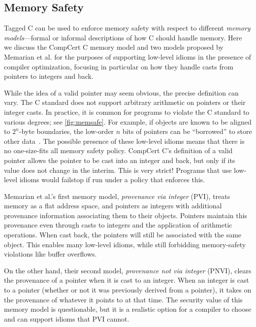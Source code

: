 \documentclass{llncs}
\begin{document}
\subsection{Memory Safety}
\label{sec:memsafe}

Tagged C can be used to enforce memory safety with respect to different {\em memory models}---formal
or informal descriptions of how C should handle memory. Here we discuss the CompCert C
memory model and two models proposed by Memarian et al. \cite{Memarian19:ExploringCSemantics}
for the purposes of supporting low-level idioms in the presence of compiler optimization, focusing in particular on how they handle
casts from pointers to integers and back.

While the idea of a valid pointer may seem obvious, the precise definition can vary. The C standard
does not support arbitrary arithmetic on pointers or their integer casts.  In practice, it is common for programs to violate the
C standard to various degrees; see \cref{fig:memsafe}. For example, if objects are known to be aligned to \(2^n\)-byte boundaries,
the low-order \(n\) bits of pointers can be ``borrowed'' to store other data~\cite{Memarian16:DeFacto}.
The possible presence of these low-level idioms means that there is no one-size-fits all memory safety policy.
CompCert C's definition of a valid pointer allows the pointer to be cast into an integer and back, but only if its value
does not change in the interim. This is very strict! Programs that use low-level idioms
would failstop if run under a policy that enforces this.

Memarian et al.'s first memory model, {\em provenance via integer} (PVI), treats memory
as a flat address space, and pointers as integers with additional provenance information
associating them to their objects. Pointers maintain this provenance even through casts to
integers and the application of arithmetic operations. When cast back, the pointers will still
be associated with the same object. This enables many low-level idioms, while still forbidding
memory-safety violations like buffer overflows.

On the other hand, their second model, {\em provenance not via integer} (PNVI), clears the
provenance of a pointer when it is cast to an integer. When an integer is cast to a pointer
(whether or not it was previously derived from a pointer), it takes on the provenance of whatever
it points to at that time. The security value of this memory model is questionable, but
it is a realistic option for a compiler to choose and can support idioms that PVI cannot.
\end{document}
